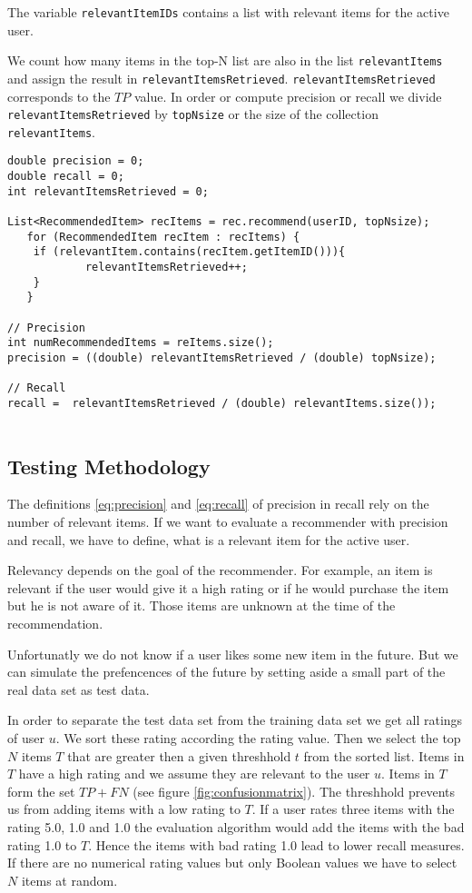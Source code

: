 The variable \verb|relevantItemIDs| contains a list with relevant items for the active user.

We count how many items in the top-N list are also in the list \verb|relevantItems| and assign the result in \verb|relevantItemsRetrieved|. \verb|relevantItemsRetrieved| corresponds to the $TP$ value. In order or compute precision or recall we divide \verb|relevantItemsRetrieved| by \verb|topNsize| or the size of the collection\\ \verb|relevantItems|.


\begin{lstlisting}[caption=Implementation of precision and recall,label=lst:irstats]
double precision = 0;
double recall = 0;
int relevantItemsRetrieved = 0;

List<RecommendedItem> recItems = rec.recommend(userID, topNsize);
   for (RecommendedItem recItem : recItems) {
	if (relevantItem.contains(recItem.getItemID())){
			relevantItemsRetrieved++;
	}
   }

// Precision
int numRecommendedItems = reItems.size();
precision = ((double) relevantItemsRetrieved / (double) topNsize);
		      
// Recall
recall =  relevantItemsRetrieved / (double) relevantItems.size());
		      
\end{lstlisting}

\subsection{Testing Methodology}
\label{sec:methodology}
The definitions \ref{eq:precision} and \ref{eq:recall} of precision in recall rely on the number of relevant items.
If we want to evaluate a recommender with \gls{precision} and \gls{recall}, we have to define, what is a relevant item for the active user. 

Relevancy depends on the goal of the recommender. For example, an item is relevant if the user would give it a high rating or if he would purchase the item but he is not aware of it.
Those items are unknown at the time of the recommendation. 

Unfortunatly we do not know if a user likes some new item in the future.
But we can simulate the prefencences of the future by setting aside a small part of the real data set as test data.

In order to separate the test data set from the training data set we get all ratings of user $u$. We sort these rating according the rating value. Then we select the top $N$ items $T$ that are greater then a given threshhold $t$ from the sorted list. Items in $T$ have a high rating and we assume they are relevant to the user $u$. Items in $T$ form the set $TP + FN$ (see figure \ref{fig:confusionmatrix}). 
The threshhold prevents us from adding items with a low rating to $T$. If a user rates three items with the rating 5.0, 1.0 and 1.0 the evaluation algorithm would add the items with the bad rating 1.0 to $T$. Hence the items with bad rating 1.0 lead to lower recall measures. 
If there are no numerical rating values but only Boolean values we have to select $N$ items at random.

